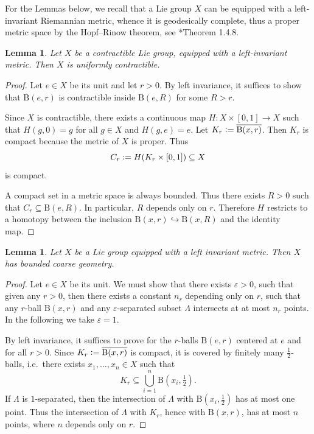 \documentclass{amsart}
\numberwithin{figure}{section}
\numberwithin{equation}{section}
\numberwithin{table}{section}
\theoremstyle{plain}
\newtheorem{lemma}[equation]{Lemma}
\theoremstyle{definition}
\theoremstyle{remark}
\theoremstyle{nonumber}
\newcommand{\Ball}{\mathrm{B}} %
\newcommand{\defeq}{\mathrel{\vcentcolon=}}
\begin{document}
For the Lemmas below, we recall that a Lie group $X$ can be equipped
with a left-invariant Riemannian metric, whence it is geodesically
complete, thus a proper metric space by the Hopf--Rinow theorem, see
\cite{Jost:Riemannian_geometry}*{Theorem 1.4.8}.

\begin{lemma}\label{lem:uniformly_contractible_Lie_group}
Let \( X \) be a contractible Lie group, equipped with a
left-invariant metric. Then \( X \) is uniformly contractible. 
\end{lemma}

\begin{proof}
Let \( e\in X \) be its unit and let \( r>0 \). 
By left invariance, it suffices to show that \( \Ball(e,r) \) is
contractible inside \( \Ball(e,R) \) for some \( R>r \).  

Since \( X \) is contractible, there exists a continuous map \(
H\colon X\times[0,1]\to X \) such that \( H(g,0)=g \) for all \( g\in X \)
and \( H(g,e)=e \). Let \( K_r\defeq \overline{\Ball(x,r)} \). Then \( K_r
\) is compact because the metric of \( X \) is proper. Thus
\[ 
  C_r\defeq H(K_r\times[0,1])\subseteq X
\]
is compact.

A compact set in a metric space is always bounded. Thus there exists \( R>0
\) such that \( C_r\subseteq \Ball(e,R) \). In particular, \( R \) depends
only on \( r \). Therefore \( H \) restricts to a homotopy between the
inclusion \( \Ball(x,r)\hookrightarrow \Ball(x,R) \) and the identity map.
\end{proof}

\begin{lemma}\label{lem:bounded_coarse_geometry_Lie_group}
Let \( X \) be a Lie group equipped with a left invariant
metric. Then \( X \) has bounded coarse geometry. 
\end{lemma}

\begin{proof}
Let \( e\in X \) be its unit. 
We must show that there exists \( \varepsilon>0 \), such that given any \(
r>0 \), then there exists a constant \( n_r
\) depending only on \( r \), such that any \( r \)-ball \( \Ball(x,r) \)
and any \( \varepsilon \)-separated subset 
\( \Lambda \) intersects at at most \( n_r\)
points. In the following we take \( \varepsilon=1 \).   

By left invariance, it suffices to prove for the \( r \)-balls \( \Ball(e,r)
\) centered at \( e \) and for all \( r>0 \). 
Since \( K_r\defeq \overline{\Ball(x,r)} \) is
compact, it is covered by finitely many \( \tfrac{1}{2} \)-balls,
i.e.~there exists \( x_1,\dots,x_n\in X \) such that
\[ 
  K_r\subseteq \bigcup_{i=1}^n\Ball(x_i,\tfrac{1}{2}).
\]
If \( \Lambda \) is \( 1 \)-separated, then the intersection of 
\( \Lambda \) with \( \Ball(x_i,\tfrac{1}{2}) \) has at most one point.
Thus the intersection of \( \Lambda \) with \( K_r \), hence with \(
\Ball(x,r) \), has at most \( n \)
points, where \( n \) depends only on \( r \).     
\end{proof}
\end{document}
